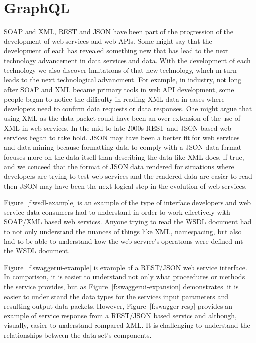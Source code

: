 \section{GraphQL}
SOAP and XML, REST and JSON have been part of the progression of the development
of web services and web APIs.  Some might say that the development of each
has revealed something new that has lead to the next technology
advancement in data services and data.  With the development of each technology
we also discover limitations of that new technology, which in-turn leads to the
next technological advancment.  For example, in industry, not long after SOAP
and XML became primary tools in web API development, some people began to
notice the difficulty in reading XML data in cases where developers need to
confirm data requests or data responses.  One might argue that using XML as the
data packet could have been an over extension of the use of XML in web
services.  In the mid to late 2000s REST and JSON based web services began to
take hold.  JSON may have been a better fit for web services and data mining
because formatting data to comply with a JSON data format focuses more on the
data itself than describing the data like XML does.  If true, and we conceed
that the format of JSON data rendered for situations where developers are trying
to test web services and the rendered data are easier to read then JSON may have
been the next logical step in the evolution of web services.  

Figure~\ref{f:wsdl-example}\cite{mycodde2016} is an example of the type of
interface developers and web service data consumers had to understand in order
to work effectively with SOAP/XML based web services.  Anyone trying to read
the WSDL document had to not only understand the nuances of things like XML,
namespacing, but also had to be able to understand how the web service's
operations were defined int the WSDL document.

Figure~\ref{f:swaggerui-example}\cite{swaggerio2018} is example of a REST/JSON web service
interface.  In comparison, it is easier to understand not only what proceedures
or methods the service provides, but as Figure~\ref{f:swaggerui-expansion}\cite{swaggerio2018}
demonstrates, it is easier to under stand the data types for the services input
parameters and resulting output data packets.  However, Figure~\ref{f:swagger-resp}\cite{swaggerresp2018}
provides an example of service  response from a REST/JSON based service and
although, visually, easier to understand compared XML.  It is challenging to
understand the relationships between the data set's components.  

